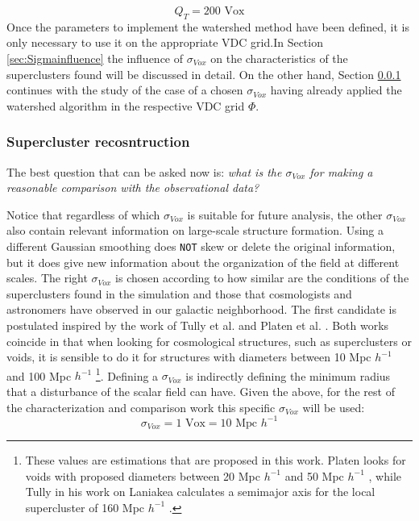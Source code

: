 \documentclass[a4paper,fleqn,usenatbib]{mnras}
\begin{document}
\begin{equation}
    Q_T = \text{200 Vox}
\end{equation}
Once the parameters to implement the watershed method have been defined, it is only necessary to use it on the appropriate VDC grid.In Section \ref{sec:Sigmainfluence} the influence of $\sigma_{Vox}$ on the characteristics of the superclusters found will be discussed in detail. On the other hand, Section \ref{sec:superclusterRecons} continues with the study of the case of a chosen  $\sigma_{Vox}$ having already applied the watershed algorithm in the respective VDC grid $\Phi$.

\subsubsection{Supercluster recosntruction}
\label{sec:superclusterRecons}
The best question that can be asked now is: \textit{what is the  $\sigma_{Vox}$ for making a reasonable comparison with the observational data?}

Notice that regardless of which $\sigma_{Vox}$ is suitable for future analysis, the other $\sigma_{Vox}$ also contain relevant information on large-scale structure formation. Using a different Gaussian smoothing does \texttt{NOT} skew or delete the original information, but it does give new information about the organization of the field at different scales. The right $\sigma_{Vox}$ is chosen according to how similar are the conditions of the superclusters found in the simulation and those that cosmologists and astronomers have observed in our galactic neighborhood. The first candidate is postulated inspired by the work of Tully et al.\cite{tully_laniakea_2014} and Platen et al. \cite{CosmicWatershedVoidDetection}. Both works coincide in that when looking for cosmological structures, such as superclusters or voids, it is sensible to do it for structures with diameters between 10 Mpc $h^{-1}$ and 100 Mpc $h^{-1}$ \footnote{These values are estimations that are proposed in this work. Platen looks for voids with proposed diameters between 20 Mpc $h^{-1}$ and 50 Mpc $h^{-1}$ , while Tully in his work on Laniakea calculates a semimajor axis for the local supercluster of 160 Mpc $h^{-1}$ .}. Defining a  $\sigma_{Vox}$ is indirectly defining the minimum radius that a disturbance of the scalar field can have. Given the above, for the rest of the characterization and comparison work this specific $\sigma_{Vox}$ will be used:
\begin{equation}
     \sigma_{Vox} = \text{1 Vox} = \text{10 Mpc }h^{-1}
\end{equation}
\end{document}
